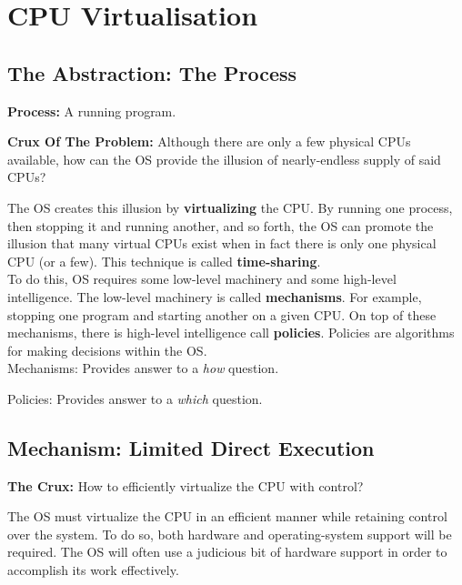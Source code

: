 \chapter{CPU Virtualisation}

\section{The Abstraction: The Process}

\textbf{Process:} A running program.\\

\begin{tcolorbox}
    \textbf{Crux Of The Problem:} Although there are only a few physical CPUs
    available, how can the OS provide the illusion of nearly-endless supply of 
    said CPUs?\\
\end{tcolorbox}

The OS creates this illusion by \textbf{virtualizing} the CPU. By running
one process, then stopping it and running another, and so forth, the OS can
promote the illusion that many virtual CPUs exist when in fact there is only
one physical CPU (or a few). This technique is called \textbf{time-sharing}.\\

To do this, OS requires some low-level machinery and some
high-level intelligence. The low-level machinery is called \textbf{mechanisms}.
For example, stopping one program and starting another on a given CPU. On top
of these mechanisms, there is high-level intelligence call \textbf{policies}.
Policies are algorithms for making decisions within the OS.\\

Mechanisms: Provides answer to a \textit{how} question.

Policies: Provides answer to a \textit{which} question.

\section{Mechanism: Limited Direct Execution}

\begin{tcolorbox}
    \textbf{The Crux:} How to efficiently virtualize the CPU with control?
\end{tcolorbox}

The OS must virtualize the CPU in an efficient manner while retaining control
over the system. To do so, both hardware and operating-system support will be
required. The OS will often use a judicious bit of hardware support in order to
accomplish its work effectively.

